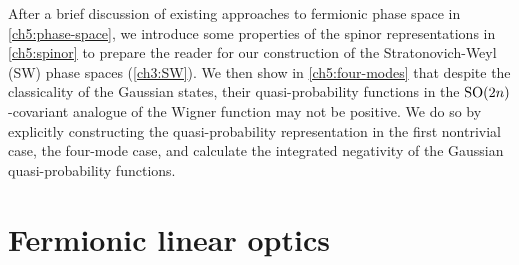 After a brief discussion of existing approaches to fermionic phase space in \autoref{ch5:phase-space}, we introduce some properties of the spinor representations in \autoref{ch5:spinor} to prepare the reader for our construction of the Stratonovich-Weyl (SW) phase spaces (\autoref{ch3:SW}). We then show in \autoref{ch5:four-modes} that despite the classicality of the Gaussian states, their quasi-probability functions in the $\text{SO}(2n)$-covariant analogue of the Wigner function may not be positive. We do so by explicitly constructing the quasi-probability representation in the first nontrivial case, the four-mode case, and calculate the integrated negativity of the Gaussian quasi-probability functions.

\section{Fermionic linear optics}\label{ch5:FLO}


